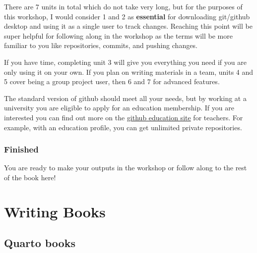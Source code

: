 \documentclass[
  letterpaper,
  DIV=11,
  numbers=noendperiod]{scrreprt}
\begin{document}
There are 7 units in total which do not take very long, but for the
purposes of this workshop, I would consider 1 and 2 as
\textbf{essential} for downloading git/github desktop and using it as a
single user to track changes. Reaching this point will be super helpful
for following along in the workshop as the terms will be more familiar
to you like repositories, commits, and pushing changes.

If you have time, completing unit 3 will give you everything you need if
you are only using it on your own. If you plan on writing materials in a
team, units 4 and 5 cover being a group project user, then 6 and 7 for
advanced features.

\begin{tcolorbox}[enhanced jigsaw, colbacktitle=quarto-callout-tip-color!10!white, titlerule=0mm, leftrule=.75mm, title=\textcolor{quarto-callout-tip-color}{\faLightbulb}\hspace{0.5em}{Apply for education membership}, breakable, bottomrule=.15mm, opacitybacktitle=0.6, rightrule=.15mm, opacityback=0, arc=.35mm, colframe=quarto-callout-tip-color-frame, toptitle=1mm, bottomtitle=1mm, toprule=.15mm, left=2mm, colback=white, coltitle=black]

The standard version of github should meet all your needs, but by
working at a university you are eligible to apply for an education
membership. If you are interested you can find out more on the
\href{https://github.com/education/teachers}{github education site} for
teachers. For example, with an education profile, you can get unlimited
private repositories.

\end{tcolorbox}

\section{Finished}\label{finished}

You are ready to make your outputs in the workshop or follow along to
the rest of the book here!

\part{Writing Books}

\chapter{Quarto books}\label{quarto_books}
\end{document}
